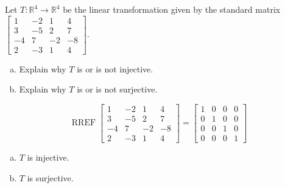 
\begin{exerciseStatement}
 Let \(T:\mathbb{R}^ 4  \to \mathbb{R}^ 4 \) be the linear transformation given by the standard matrix \( \left[\begin{array}{cccc}
1 & -2 & 1 & 4 \\
3 & -5 & 2 & 7 \\
-4 & 7 & -2 & -8 \\
2 & -3 & 1 & 4
\end{array}\right] .\)
\begin{enumerate}[(a)]
\item Explain why \(T\) is or is not injective.
\item Explain why \(T\) is or is not surjective.
\end{enumerate}
    
\end{exerciseStatement}
    
\begin{exerciseAnswer} 


\[\operatorname{RREF} \left[\begin{array}{cccc}
1 & -2 & 1 & 4 \\
3 & -5 & 2 & 7 \\
-4 & 7 & -2 & -8 \\
2 & -3 & 1 & 4
\end{array}\right] = \left[\begin{array}{cccc}
1 & 0 & 0 & 0 \\
0 & 1 & 0 & 0 \\
0 & 0 & 1 & 0 \\
0 & 0 & 0 & 1
\end{array}\right] \]


\begin{enumerate}[(a)]
\item \(T\) is injective.
\item \(T\) is surjective.
\end{enumerate}
    
\end{exerciseAnswer}
    
